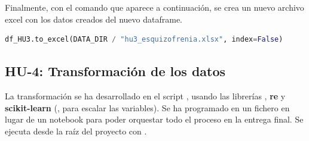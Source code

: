 \documentclass[11pt,a4paper]{article}
\begin{document}
Finalmente, con el comando que aparece a continuación, se crea un nuevo archivo excel con
los datos creados del nuevo dataframe.

\noindent\begin{minipage}{\linewidth}
\begin{lstlisting}[language=Python, caption={Comando que convierte el dataframe en .xlsx}, label={lst:hu3_exportar_excel}]
df_HU3.to_excel(DATA_DIR / "hu3_esquizofrenia.xlsx", index=False)
\end{lstlisting}
\end{minipage}

\subsection{HU-4: Transformación de los datos}
La transformación se ha desarrollado en el script , usando las librerías , \textbf{re} y \textbf{scikit-learn} (, para
escalar las variables). Se ha programado en un fichero  en lugar de un notebook para poder
orquestar todo el proceso en la entrega final. Se ejecuta desde la raíz del proyecto con
 .
\end{document}
